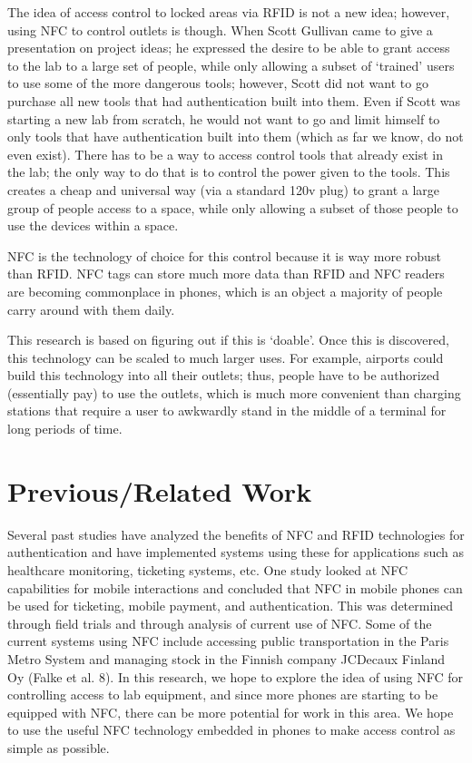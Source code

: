 \documentclass{sigchi}
\begin{document}
The idea of access control to locked areas via RFID is not a new idea; however, using NFC to control outlets is though. When Scott Gullivan came to give a presentation on project ideas; he expressed the desire to be able to grant access to the lab to a large set of people, while only allowing a subset of ‘trained’ users to use some of the more dangerous tools; however, Scott did not want to go purchase all new tools that had authentication built into them. Even if Scott was starting a new lab from scratch, he would not want to go and limit himself to only tools that have authentication built into them (which as far we know, do not even exist). There has to be a way to access control tools that already exist in the lab; the only way to do that is to control the power given to the tools. This creates a cheap and universal way (via a standard 120v plug) to grant a large group of people access to a space, while only allowing a subset of those people to use the devices within a space. 

NFC is the technology of choice for this control because it is way more robust than RFID. NFC tags can store much more data than RFID and NFC readers are becoming commonplace in phones, which is an object a majority of people carry around with them daily.

This research is based on figuring out if this is ‘doable’. Once this is discovered, this technology can be scaled to much larger uses. For example, airports could build this technology into all their outlets; thus, people have to be authorized (essentially pay) to use the outlets, which is much more convenient than charging stations that require a user to awkwardly stand in the middle of a terminal for long periods of time. 

\section{Previous/Related Work}

Several past studies have analyzed the benefits of NFC and RFID technologies for authentication and have implemented systems using these for applications such as healthcare monitoring, ticketing systems, etc. One study looked at NFC capabilities for mobile interactions and concluded that NFC in mobile phones can be used for ticketing, mobile payment, and authentication. This was determined through field trials and through analysis of current use of NFC. Some of the current systems using NFC include accessing public transportation in the Paris Metro System and managing stock in the Finnish company JCDecaux Finland Oy (Falke et al. 8). In this research, we hope to explore the idea of using NFC for controlling access to lab equipment, and since more phones are starting to be equipped with NFC, there can be more potential for work in this area. We hope to use the useful NFC technology embedded in phones to make access control as simple as possible.
\end{document}

